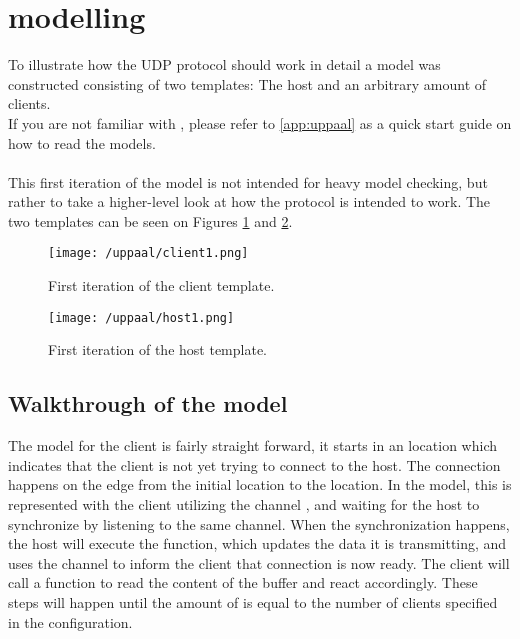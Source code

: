 \section{\uppaal modelling}\label{sec:sprint3-uppaal}
To illustrate how the UDP protocol should work in detail a \uppaal model was constructed consisting of two templates: The host and an arbitrary amount of clients.\\
If you are not familiar with \uppaal, please refer to \autoref{app:uppaal} as a quick start guide on how to read the models.\\\\
This first iteration of the model is not intended for heavy model checking, but rather to take a higher-level look at how the protocol is intended to work.
The two templates can be seen on Figures \ref{fig:uppaal-client-1} and \ref{fig:uppaal-host-1}.

\begin{figure}[H]
    \centering
    \texttt{[image: /uppaal/client1.png]}
    \caption{First iteration of the \uppaal client template.}
    \label{fig:uppaal-client-1}
\end{figure}

\begin{figure}[H]
    \centering
    \texttt{[image: /uppaal/host1.png]}
    \caption{First iteration of the \uppaal host template.}
    \label{fig:uppaal-host-1}
\end{figure}

\subsection{Walkthrough of the model}
The model for the client is fairly straight forward, it starts in an  location which indicates that the client is not yet trying to connect to the host.
The connection happens on the edge from the initial location to the  location.
In the model, this is represented with the client utilizing the channel , and waiting for the host to synchronize by listening to the same channel.
When the synchronization happens, the host will execute the  function, which updates the data it is transmitting, and uses the channel  to inform the client that connection is now ready.
The client will call a function  to read the content of the buffer and react accordingly.
These steps will happen until the amount of  is equal to the number of clients specified in the configuration.

